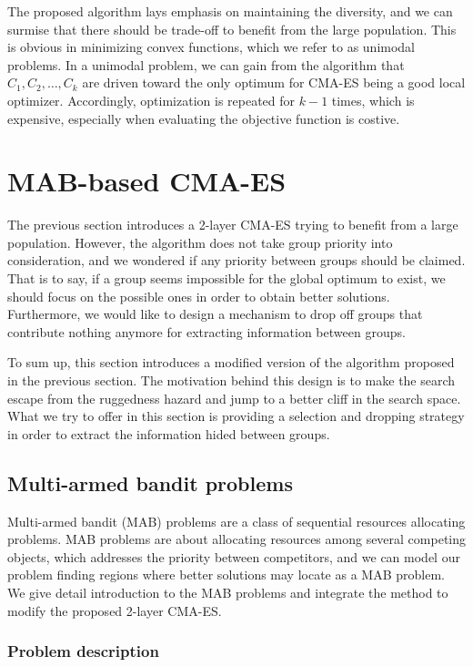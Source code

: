 The proposed algorithm lays emphasis on maintaining the diversity, and
we can surmise that there should be trade-off to benefit from the large
population.
This is obvious in minimizing convex functions, which we refer to as
unimodal problems.
In a unimodal problem, we can gain from the algorithm that $C_1, C_2,
\ldots, C_k$ are driven toward the only optimum for CMA-ES being a good
local optimizer.
Accordingly, optimization is repeated for $k-1$ times, which is
expensive, especially when evaluating the objective function is costive.


\section{MAB-based CMA-ES} \label{MAB-based}

The previous section introduces a 2-layer CMA-ES trying to benefit from
a large population.
However, the algorithm does not take group priority into consideration,
and we wondered if any priority between groups should be claimed.
That is to say, if a group seems impossible for the global optimum to
exist, we should focus on the possible ones in order to obtain better
solutions.
Furthermore, we would like to design a mechanism to drop off groups that
contribute nothing anymore for extracting information between groups.

To sum up, this section introduces a modified version of the algorithm
proposed in the previous section.
The motivation behind this design is to make the search escape from the
ruggedness hazard and jump to a better cliff in the search space.
What we try to offer in this section is providing a selection and
dropping strategy in order to extract the information hided between
groups.

\subsection{Multi-armed bandit problems}

Multi-armed bandit (MAB) problems are a class of sequential resources
allocating problems.
MAB problems are about allocating resources among several competing
objects, which addresses the priority between competitors, and
we can model our problem finding regions where better solutions may
locate as a MAB problem.
We give detail introduction to the MAB problems and
integrate the method to modify the proposed 2-layer CMA-ES.

\subsubsection{Problem description}

